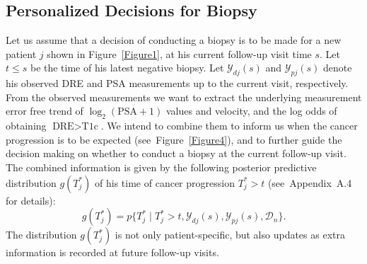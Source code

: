 \documentclass[Afour,sagev,times]{sagej}
\begin{document}
\subsection{Personalized Decisions for Biopsy}
\label{subsec:pers_decision_making}
Let us assume that a decision of conducting a biopsy is to be made for a new patient $j$ shown in Figure~\ref{Figure1}, at his current follow-up visit time $s$. Let $t\leq s$ be the time of his latest negative biopsy. Let $\mathcal{Y}_{dj}(s)$ and $\mathcal{Y}_{pj}(s)$ denote his observed DRE and PSA measurements up to the current visit, respectively. From the observed measurements we want to extract the underlying measurement error free trend of $\log_2 (\mbox{PSA} + 1)$ values and velocity, and the log odds of obtaining $\mbox{DRE} > \mbox{T1c}$. We intend to combine them to inform us when the cancer progression is to be expected (see~Figure~\ref{Figure4}), and to further guide the decision making on whether to conduct a biopsy at the current follow-up visit. The combined information is given by the following posterior predictive distribution $g(T^*_j)$ of his time of cancer progression $T^*_j > t$ (see~Appendix~A.4 for details):
\begin{equation}
\label{eq:post_pred_dist}
g(T^*_j) = p\big\{T^*_j \mid T^*_j > t, \mathcal{Y}_{dj}(s), \mathcal{Y}_{pj}(s), \mathcal{D}_n\big\}.
\end{equation}
The distribution $g(T^*_j)$ is not only patient-specific, but also updates as extra information is recorded at future follow-up visits.
\end{document}

